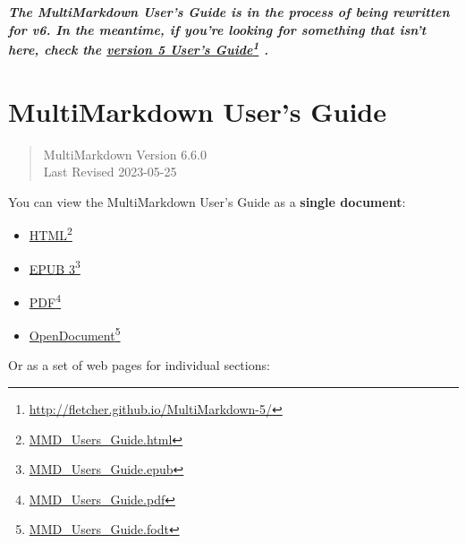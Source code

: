 
\def\mytitle{MultiMarkdown User's Guide}
\def\myauthor{Fletcher T. Penney}
\def\version{6.6.0}
\def\revised{2023-05-25}




\textbf{\emph{The MultiMarkdown User's Guide is in the process of being rewritten for v6. In the meantime, if you're looking for something that isn't here, check the \href{http://fletcher.github.io/MultiMarkdown-5/}{version 5 User's Guide}\footnote{\href{http://fletcher.github.io/MultiMarkdown-5/}{http:\slash{}\slash{}fletcher.github.io\slash{}MultiMarkdown-5\slash{}}} .}}

\chapter{MultiMarkdown User's Guide}
\label{title}

\begin{quote}
MultiMarkdown Version 6.6.0\\
Last Revised 2023-05-25
\end{quote}

You can view the MultiMarkdown User's Guide as a \textbf{single document}:

\begin{itemize}
\item \href{MMD_Users_Guide.html}{HTML}\footnote{\href{MMD_Users_Guide.html}{MMD\_Users\_Guide.html}}

\item \href{MMD_Users_Guide.epub}{EPUB 3}\footnote{\href{MMD_Users_Guide.epub}{MMD\_Users\_Guide.epub}}

\item \href{MMD_Users_Guide.pdf}{PDF}\footnote{\href{MMD_Users_Guide.pdf}{MMD\_Users\_Guide.pdf}}

\item \href{MMD_Users_Guide.fodt}{OpenDocument}\footnote{\href{MMD_Users_Guide.fodt}{MMD\_Users\_Guide.fodt}}

\end{itemize}

Or as a set of web pages for individual sections:

